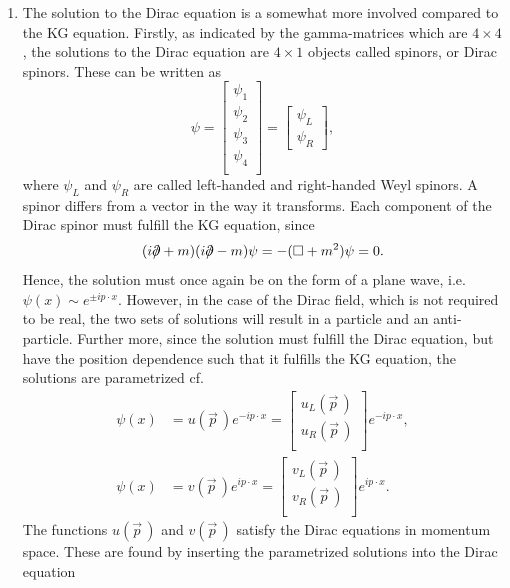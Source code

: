 \begin{enumerate}
	\item The solution to the Dirac equation is a somewhat more involved compared to the KG equation. Firstly, as indicated by the gamma-matrices which are $4\times 4$, the solutions to the Dirac equation are $4\times 1$ objects called spinors, or Dirac spinors. These can be written as
	\begin{equation}
		\psi=\begin{bmatrix}
			\psi_1\\
			\psi_2\\
			\psi_3\\
			\psi_4\\
		\end{bmatrix}=\begin{bmatrix}
		\psi_L\\
		\psi_R
	\end{bmatrix},
\end{equation} 
where $\psi_L$ and $\psi_R$ are called left-handed and right-handed Weyl spinors. A spinor differs from a vector in the way it transforms. Each component of the Dirac spinor must fulfill the KG equation, since
\begin{equation}
	(i\slashed \partial+m)(i\slashed \partial -m)\psi=-(\square+m^2)\psi=0.
\end{equation} 
Hence, the solution must once again be on the form of a plane wave, i.e. $\psi(x)\sim e^{\pm ip\cdot x}$. However, in the case of the Dirac field, which is not required to be real, the two sets of solutions will result in a particle and an anti-particle. Further more, since the solution must fulfill the Dirac equation, but have the position dependence such that it fulfills the KG equation, the solutions are parametrized cf.
\begin{equation}
	\begin{split}
		\psi(x)&=u(\vec{p}\,)e^{-ip\cdot x}=\begin{bmatrix}
			u_L(\vec{p}\,) \\u_R(\vec{p}\,)\\
		\end{bmatrix}e^{-ip\cdot x},\\
		\psi(x)&=v(\vec{p}\,)e^{ip\cdot x}=\begin{bmatrix}
			v_L(\vec{p}\,)\\
			v_R(\vec{p}\,)\\
		\end{bmatrix}e^{ip\cdot x}.
	\end{split}
\end{equation} 
The functions $u(\vec{p}\,)$ and $v(\vec{p}\,)$ satisfy the Dirac equations in momentum space. These are found by inserting the parametrized solutions into the Dirac equation

\end{enumerate}
